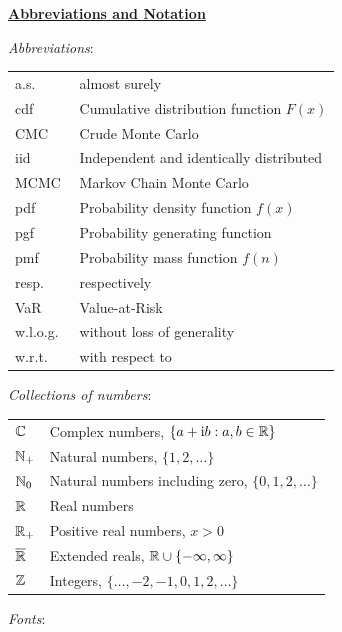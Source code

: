 {\bf \underline{Abbreviations and Notation}}



\emph{Abbreviations}:

\begin{tabular}{ll}
a.s. & almost surely \\
cdf & Cumulative distribution function $F(x)$ \\
CMC & Crude Monte Carlo \\
iid & Independent and identically distributed  \\
MCMC & Markov Chain Monte Carlo \\
pdf & Probability density function  $f(x)$ \\
pgf & Probability generating function \\
pmf & Probability mass function $f(n)$ \\
resp. & respectively \\
VaR & Value-at-Risk \\
w.l.o.g.\ & without loss of generality \\
w.r.t.\ & with respect to
\end{tabular}


\emph{Collections of numbers}:

\begin{tabular}{ll}
$\mathbb{C}$ & Complex numbers, $\{ a + \mathrm{i} b : a,b \in \mathbb{R} \}$ \\
$\mathbb{N}_+$ & Natural numbers, $\{1, 2, \dots\}$ \\
$\mathbb{N}_0$ & Natural numbers including zero, $\{0, 1, 2, \dots\}$ \\
$\mathbb{R}$ & Real numbers \\
$\mathbb{R}_+$ & Positive real numbers, $x > 0$ \\
$\overline{\mathbb{R}}$ & Extended reals, $\mathbb{R} \cup \{-\infty, \infty\}$ \\
$\mathbb{Z}$ & Integers, $\{ \dots, -2, -1, 0, 1, 2, \dots \}$
\end{tabular}

\emph{Fonts}:

